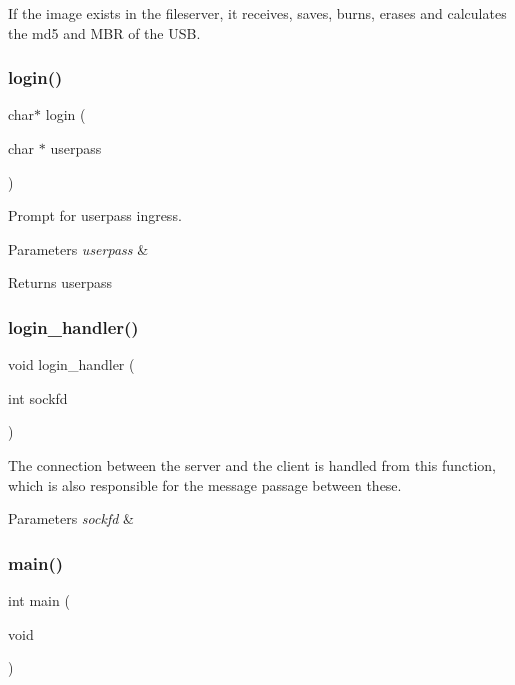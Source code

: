 If the image exists in the fileserver, it receives, saves, burns, erases and calculates the md5 and M\+BR of the U\+SB. 

\mbox{\label{client_8c_a0d2a952bfee88348e1792d66acf01e38}} 
\subsubsection{login()}
{\footnotesize\ttfamily char$\ast$ login (\begin{DoxyParamCaption}\item[{char $\ast$}]{userpass }\end{DoxyParamCaption})}



Prompt for userpass ingress. 


\begin{DoxyParams}{Parameters}
{\em userpass} & \\
\hline
\end{DoxyParams}
\begin{DoxyReturn}{Returns}
userpass 
\end{DoxyReturn}
\mbox{\label{client_8c_a471ae164131962c0fe21a47e23706139}} 
\subsubsection{login\+\_\+handler()}
{\footnotesize\ttfamily void login\+\_\+handler (\begin{DoxyParamCaption}\item[{int}]{sockfd }\end{DoxyParamCaption})}



The connection between the server and the client is handled from this function, which is also responsible for the message passage between these. 


\begin{DoxyParams}{Parameters}
{\em sockfd} & \\
\hline
\end{DoxyParams}
\mbox{\label{client_8c_ae66f6b31b5ad750f1fe042a706a4e3d4}} 
\subsubsection{main()}
{\footnotesize\ttfamily int main (\begin{DoxyParamCaption}\item[{void}]{ }\end{DoxyParamCaption})}

